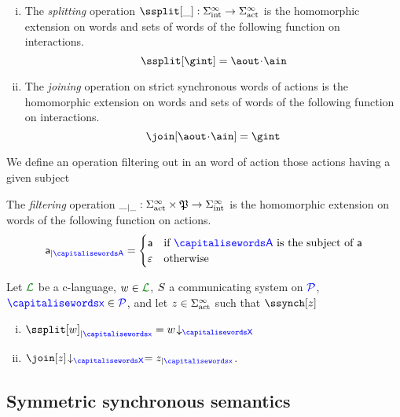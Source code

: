 \begin{definition}\label{def:decomp}
\begin{enumerate}[i)]
\item
  The \emph{splitting} operation
  $\ssplit[\_]: \alfint^\infty \to \alfact^\infty$ 
  is the homomorphic extension on words and sets of words of the following function on interactions. 
  \[
	 \ssplit[\gint] = \aout\cat\ain
  \]
  \item
  The \emph{joining} operation on strict synchronous words of actions 
  is the homomorphic extension on words and sets of words of the following function on interactions. 
  \[
	 \join[\aout\cat\ain] = \gint
  \]
  \end{enumerate}
\end{definition}

We define an operation filtering out in an word of action those actions  having a given subject

\begin{definition}[Filtering]\label{def:decomp}
  The \emph{filtering} operation
  ${\_}_{\mid \_}: \Sigma_{\text{act}}^\infty \times \mathfrak{P} \to
  \Sigma_{\text{int}}^\infty$ is the homomorphic extension on words of the following function on actions. 
  \[
	 \filter{\aact}{\p} =
	 \begin{cases}
		\aact &  \text{if } \p \text{ is the subject of } \aact
		\\
		\emptyword &  \text{otherwise}
	 \end{cases}
  \]
\end{definition}

\begin{fact}
\label{fac:joinsplit}
Let $\clang$ be a c-language, $\acword\in\clang$, $S$ a communicating system on $\mathcal{\color{blue}{P}}$, $\px\in\ptpset$, and let $z\in\Sigma_{\text{act}}^\infty$ such that $\ssynch[z]$
\begin{enumerate}[i)]
\item
\label{fac:joinsplit-a}
$\filter{{\ssplit[{\acword}]}}{\px} = \proj{\acword}{X}$
\item
\label{fac:joinsplit-feqp}
$\proj{\join[z]}{X} = \filter{z}{\px}$. 

\end{enumerate}
\end{fact}



\subsection{Symmetric synchronous semantics}

